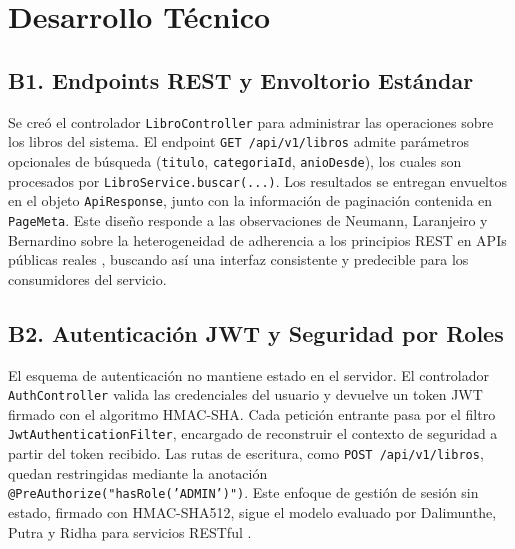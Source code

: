 \documentclass[11pt,a4paper]{article}
\begin{document}
\section{Desarrollo Técnico}

\subsection{B1. Endpoints REST y Envoltorio Estándar}
Se creó el controlador \texttt{LibroController} para administrar las operaciones sobre los libros del sistema. El endpoint \texttt{GET /api/v1/libros} admite parámetros opcionales de búsqueda (\texttt{titulo}, \texttt{categoriaId}, \texttt{anioDesde}), los cuales son procesados por \texttt{LibroService.buscar(...)}. Los resultados se entregan envueltos en el objeto \texttt{ApiResponse}, junto con la información de paginación contenida en \texttt{PageMeta}. Este diseño responde a las observaciones de Neumann, Laranjeiro y Bernardino sobre la heterogeneidad de adherencia a los principios REST en APIs públicas reales \cite{neumann2021analysis}, buscando así una interfaz consistente y predecible para los consumidores del servicio.

\subsection{B2. Autenticación JWT y Seguridad por Roles}
El esquema de autenticación no mantiene estado en el servidor. El controlador \texttt{AuthController} valida las credenciales del usuario y devuelve un token JWT firmado con el algoritmo HMAC-SHA. Cada petición entrante pasa por el filtro \texttt{JwtAuthenticationFilter}, encargado de reconstruir el contexto de seguridad a partir del token recibido. Las rutas de escritura, como \texttt{POST /api/v1/libros}, quedan restringidas mediante la anotación \texttt{@PreAuthorize("hasRole('ADMIN')")}. Este enfoque de gestión de sesión sin estado, firmado con HMAC-SHA512, sigue el modelo evaluado por Dalimunthe, Putra y Ridha para servicios RESTful \cite{dalimunthe2023jwt}.
\end{document}
